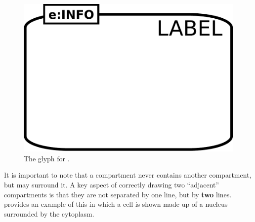 \begin{figure}[H]
  \centering
  \includegraphics[scale = 0.3]{images/compartment}
  \caption{The \PD glyph for .}
  \label{fig:compartment}
\end{figure}


It is important to note that a compartment never contains another compartment, but may surround it.  A key aspect of correctly drawing two ``adjacent'' compartments is that they are not separated by one line, but by \textbf{two} lines.   provides an example of this in which a cell is shown made up of a nucleus surrounded by the cytoplasm.

